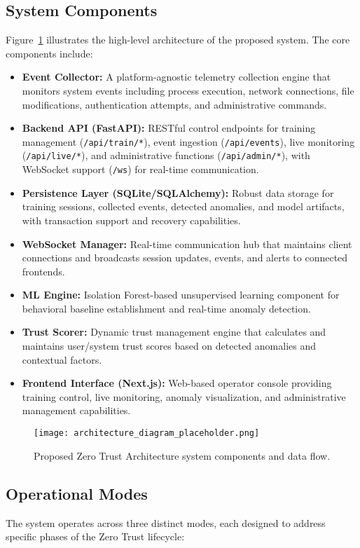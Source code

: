 \documentclass[conference]{IEEEtran}
\begin{document}
\subsection{System Components}
Figure~\ref{fig:arch} illustrates the high-level architecture of the proposed system. The core components include:

\begin{itemize}[leftmargin=*]
  \item \textbf{Event Collector:} A platform-agnostic telemetry collection engine that monitors system events including process execution, network connections, file modifications, authentication attempts, and administrative commands.
  \item \textbf{Backend API (FastAPI):} RESTful control endpoints for training management (\texttt{/api/train/*}), event ingestion (\texttt{/api/events}), live monitoring (\texttt{/api/live/*}), and administrative functions (\texttt{/api/admin/*}), with WebSocket support (\texttt{/ws}) for real-time communication.
  \item \textbf{Persistence Layer (SQLite/SQLAlchemy):} Robust data storage for training sessions, collected events, detected anomalies, and model artifacts, with transaction support and recovery capabilities.
  \item \textbf{WebSocket Manager:} Real-time communication hub that maintains client connections and broadcasts session updates, events, and alerts to connected frontends.
  \item \textbf{ML Engine:} Isolation Forest-based unsupervised learning component for behavioral baseline establishment and real-time anomaly detection.
  \item \textbf{Trust Scorer:} Dynamic trust management engine that calculates and maintains user/system trust scores based on detected anomalies and contextual factors.
  \item \textbf{Frontend Interface (Next.js):} Web-based operator console providing training control, live monitoring, anomaly visualization, and administrative management capabilities.
\end{itemize}

\begin{figure}[t]
  \centering
  \texttt{[image: architecture\_diagram\_placeholder.png]}
  \caption{Proposed Zero Trust Architecture system components and data flow.}
  \label{fig:arch}
\end{figure}

\subsection{Operational Modes}
The system operates across three distinct modes, each designed to address specific phases of the Zero Trust lifecycle:
\end{document}

